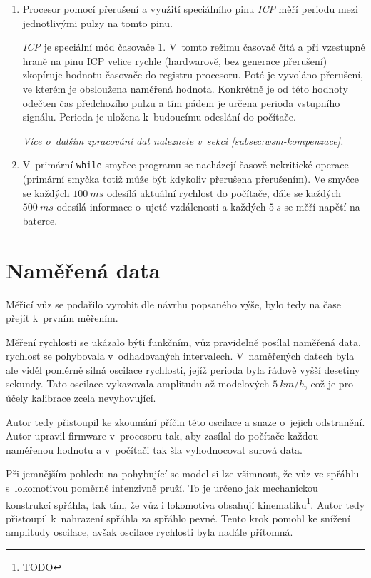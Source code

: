 \begin{enumerate}
\item Procesor pomocí přerušení a využití speciálního pinu \textit{ICP}
měří periodu mezi jednotlivými pulzy na tomto pinu.

\textit{ICP} je speciální mód časovače 1. V~tomto režimu časovač čítá a při
vzestupné hraně na pinu ICP velice rychle (hardwarově, bez generace přerušení)
zkopíruje hodnotu časovače do registru procesoru. Poté je vyvoláno přerušení,
ve kterém je obsloužena naměřená hodnota. Konkrétně je od této hodnoty odečten
čas předchozího pulzu a tím pádem je určena perioda vstupního signálu. Perioda
je uložena k~budoucímu odeslání do počítače.

\textit{Více o~dalším zpracování dat naleznete v~sekci
\ref{subsec:wsm-kompenzace}.}

\item V~primární \texttt{while} smyčce programu se nacházejí časově nekritické
operace (primární smyčka totiž může být kdykoliv přerušena přerušením). Ve
smyčce se každých $100\ ms$ odesílá aktuální rychlost do počítače, dále se každých
$500\ ms$ odesílá informace o~ujeté vzdálenosti a každých $5\ s$ se měří napětí
na baterce.

\end{enumerate}

\section{Naměřená data}
\label{sec:wsm-data}

Měřicí vůz se podařilo vyrobit dle návrhu popsaného výše, bylo tedy na čase
přejít k~prvním měřením.

Měření rychlosti se ukázalo býti funkčním, vůz pravidelně posílal naměřená
data, rychlost se pohybovala v~odhadovaných intervalech. V~naměřených datech
byla ale viděl poměrně silná oscilace rychlosti, jejíž perioda byla řádově
vyšší desetiny sekundy. Tato oscilace vykazovala amplitudu až modelových
$5\ km/h$, což je pro účely kalibrace zcela nevyhovující.

Autor tedy přistoupil ke zkoumání příčin této oscilace a snaze o~jejich
odstranění. Autor upravil firmware v~procesoru tak, aby zasílal do počítače
každou naměřenou hodnotu a v~počítači tak šla vyhodnocovat surová data.

Při jemnějším pohledu na pohybující se model si lze všimnout, že vůz ve spřáhlu
s~lokomotivou poměrně intenzivně pruží. To je určeno jak mechanickou konstrukcí
spřáhla, tak tím, že vůz i lokomotiva obsahují kinematiku\footnote{\url{TODO}}.
Autor tedy přistoupil k~nahrazení spřáhla za spřáhlo pevné. Tento krok pomohl
ke snížení amplitudy oscilace, avšak oscilace rychlosti byla nadále přítomná.

